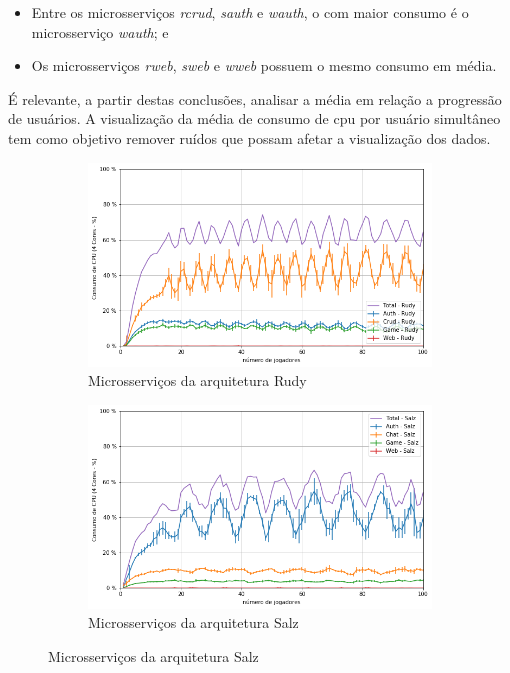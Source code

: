 \begin{itemize}
 \item Entre os microsserviços \textit{rcrud}, \textit{sauth} e \textit{wauth}, o com maior consumo é o microsserviço \textit{wauth}; e
 \item Os microsserviços \textit{rweb}, \textit{sweb} e \textit{wweb} possuem o mesmo consumo em média.
\end{itemize}

É relevante, a partir destas conclusões, analisar a média em relação a progressão de usuários.
%
A visualização da média de consumo de \ac{cpu} por usuário simultâneo tem como objetivo remover ruídos que possam afetar a visualização dos dados.

\begin{figure}[htb!]
    \caption{Média do consumo de \ac{cpu} dos microsserviços por jogador simultâneo}
    \label{fig:cpu_game_media_por_jogador}

    \begin{subfigure}{0.5\textwidth}
        \centering
        \includegraphics[width=.95\linewidth]{figuras/analise/cpu_r_arch_media_por_jogador.png}
        \caption{Microsserviços da arquitetura Rudy}
        \label{fig:cpu_r_arch_media_por_jogador}
    \end{subfigure}%
    \begin{subfigure}{0.5\textwidth}
        \centering
        \includegraphics[width=.95\linewidth]{figuras/analise/cpu_s_arch_media_por_jogador.png}
        \caption{Microsserviços da arquitetura Salz}
        \label{fig:cpu_s_arch_media_por_jogador}
    \end{subfigure}


\end{figure}
